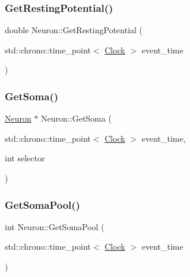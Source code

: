 \mbox{\label{classNeuron_a0573244d3c78a22a45c249db536cbb68}} 
\subsubsection{\texorpdfstring{Get\+Resting\+Potential()}{GetRestingPotential()}}
{\footnotesize\ttfamily double Neuron\+::\+Get\+Resting\+Potential (\begin{DoxyParamCaption}\item[{std\+::chrono\+::time\+\_\+point$<$ \mbox{\hyperlink{universe_8h_a0ef8d951d1ca5ab3cfaf7ab4c7a6fd80}{Clock}} $>$}]{event\+\_\+time }\end{DoxyParamCaption})\hspace{0.3cm}{\ttfamily [inline]}}

\mbox{\label{classNeuron_a8539a7965349078a7b1c1265895daefa}} 
\subsubsection{\texorpdfstring{Get\+Soma()}{GetSoma()}}
{\footnotesize\ttfamily \mbox{\hyperlink{classNeuron}{Neuron}} $\ast$ Neuron\+::\+Get\+Soma (\begin{DoxyParamCaption}\item[{std\+::chrono\+::time\+\_\+point$<$ \mbox{\hyperlink{universe_8h_a0ef8d951d1ca5ab3cfaf7ab4c7a6fd80}{Clock}} $>$}]{event\+\_\+time,  }\item[{int}]{selector }\end{DoxyParamCaption})}

\mbox{\label{classNeuron_aa6f1237ed89c48eb57610083edf43efa}} 
\subsubsection{\texorpdfstring{Get\+Soma\+Pool()}{GetSomaPool()}}
{\footnotesize\ttfamily int Neuron\+::\+Get\+Soma\+Pool (\begin{DoxyParamCaption}\item[{std\+::chrono\+::time\+\_\+point$<$ \mbox{\hyperlink{universe_8h_a0ef8d951d1ca5ab3cfaf7ab4c7a6fd80}{Clock}} $>$}]{event\+\_\+time }\end{DoxyParamCaption})\hspace{0.3cm}{\ttfamily [inline]}}

